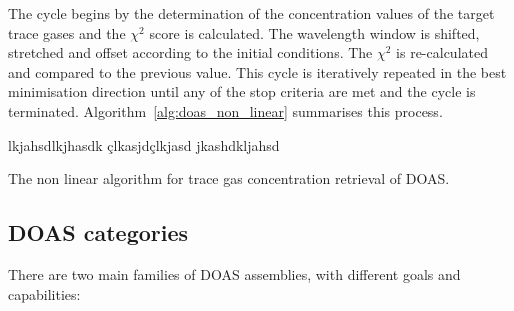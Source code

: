 The cycle begins by the determination of the concentration values of the
target trace gases and the $\chi^2$ score is calculated. The wavelength
window is shifted, stretched and offset according to the initial
conditions. The $\chi^2$ is re-calculated and compared to the previous
value. This cycle is iteratively repeated in the best minimisation
direction until any of the stop criteria are met and the cycle is
terminated. Algorithm~\ref{alg:doas_non_linear} summarises this process.


\begin{algorithm}[htb]
\SetAlgoLined
{}
lkjahsdlkjhasdk
çlkasjdçlkjasd
jkashdkljahsd
\caption{The non linear algorithm for trace gas concentration retrieval
of \gls{DOAS}.}
\label{alg:doas_non_linear}
\end{algorithm}

\subsection{\gls{DOAS} categories}%
\label{sub:doas_categories}

There are two main families of \gls{DOAS} assemblies, with different
goals and capabilities:


